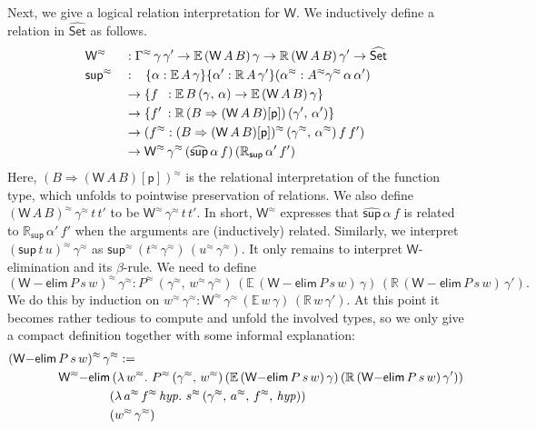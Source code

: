 \documentclass[acmsmall]{acmart}
\newcommand{\msf}[1]{{\mathsf{#1}}}
\newcommand{\mbb}[1]{\mathbb{#1}}
\newcommand{\rel}{^{\approx}}
\newcommand{\p}{\mathsf{p}}
\newcommand{\wh}[1]{\widehat{#1}}
\newcommand{\whset}{\wh{\Set}}
\newcommand{\ev}{\mbb{E}}
\newcommand{\re}{\mbb{R}}
\newcommand{\welim}{\vW{-}\msf{elim}}
\newcommand{\vW}{\mathsf{W}}
\newcommand{\vsup}{\mathsf{sup}}
\newcommand{\Set}{\msf{Set}}
\theoremstyle{remark}
\begin{document}
Next, we give a logical relation interpretation for $\vW$. We inductively define
a relation in $\whset$ as follows.
\begin{alignat*}{3}
  & \vW\rel &&: \Gamma\rel\,\gamma\,\gamma' \to \ev\,(\vW\,A\,B)\,\gamma \to \re\,(\vW\,A\,B)\,\gamma' \to \whset\\
  & \vsup\rel &&: \hspace{0.8em}\{\alpha : \ev\,A\,\gamma\}\{\alpha' : \re\,A\,\gamma'\}(\alpha\rel : A\rel \gamma\rel\,\alpha\,\alpha')\\
  &           &&\to \{f \hspace{0.5em}: \ev\,B\,(\gamma,\,\alpha) \to \ev\,(\vW\,A\,B)\,\gamma\}\\
  &           &&\to \{f' \hspace{0.2em}: \re\,(B \Rightarrow (\vW\,A\,B)[\p])\,(\gamma',\,\alpha')\}\\
  &           &&\to (f\rel : (B \Rightarrow (\vW\,A\,B)[\p])\rel\,(\gamma\rel,\,\alpha\rel)\,f\,f')\\
  &           &&\to \vW\rel\,\gamma\rel\,(\wh{\vsup}\,\alpha\,f)\,(\re_\vsup\,\alpha'\,f')
\end{alignat*}
Here, $(B \Rightarrow (\vW\,A\,B)[\p])\rel$ is the relational interpretation of
the function type, which unfolds to pointwise preservation of relations. We also
define $(\vW\,A\,B)\rel\,\gamma\rel\,t\,t'$ to be $\vW\rel\,\gamma\rel\,t\,t'$.
In short, $\vW\rel$ expresses that $\wh{\vsup}\,\alpha\,f$ is related to
$\re_\vsup\,\alpha'\,f'$ when the arguments are (inductively) related. Similarly, we
interpret $(\vsup\,t\,u)\rel\,\gamma\rel$ as
$\vsup\rel\,(t\rel\,\gamma\rel)\,(u\rel\,\gamma\rel)$. It only remains to
interpret $\vW$-elimination and its $\beta$-rule. We need to define
\[ (\vW{-}\msf{elim}\,P\,s\,w)\rel\,\gamma\rel : P\rel\,(\gamma\rel,\,w\rel\,\gamma\rel)\,(\ev\,(\welim\,P\,s\,w)\,\gamma)\,(\re\,(\welim\,P\,s\,w)\,\gamma'). \]
We do this by induction on $w\rel\,\gamma\rel :
\vW\rel\,\gamma\rel\,(\ev\,w\,\gamma)\,(\re\,w\,\gamma')$. At this point it
becomes rather tedious to compute and unfold the involved types, so we only give
a compact definition together with some informal explanation:
\begin{alignat*}{3}
  &(\vW{-}\msf{elim}\,P\,s\,w)\rel\,\gamma\rel :=\\
  &\hspace{4em}\vW\rel{-}\msf{elim}\,(\lambda\,w\rel.\,\,P\rel\,(\gamma\rel,\,w\rel)\,(\ev\,(\welim\,P\,s\,w)\,\gamma)\,(\re\,(\welim\,P\,s\,w)\,\gamma'))\\
  &\hspace{8.1em}(\lambda\,a\rel\,f\rel\,\mathit{hyp}.\,\,s\rel\,(\gamma\rel,\,a\rel,\,f\rel,\,\mathit{hyp}))\\
  &\hspace{8.1em}(w\rel\,\gamma\rel)
\end{alignat*}
\end{document}

